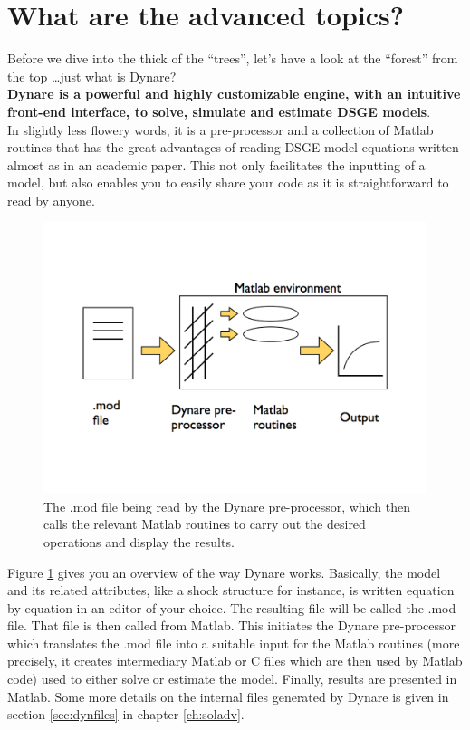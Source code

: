 \documentclass[cn,10pt,math=newtx,citestyle=gb7714-2015,bibstyle=gb7714-2015]{elegantbook}
\begin{document}
	
	\section{What are the advanced topics?}
	Before we dive into the thick of the ``trees'', let's have a look at the ``forest'' from the top \ldots just what is Dynare? \\
	
	\textbf{Dynare is a powerful and highly customizable engine, with an intuitive front-end interface, to solve, simulate and estimate DSGE models}. \\
	
	In slightly less flowery words, it is a pre-processor and a collection of Matlab routines that has the great advantages of reading DSGE model equations written almost as in an academic paper. This not only facilitates the inputting of a model, but also enables you to easily share your code as it is straightforward to read by anyone.\\
	\begin{figure} \label{fig:dyn}
		\begin{center}
			\includegraphics[width=1.0\textwidth]{P_DynareStruct2}
		\end{center}
		\caption[Dynare, a bird's eyeview]{The .mod file being read by the Dynare pre-processor, which then calls the relevant Matlab routines to carry out the desired operations and display the results.}
	\end{figure}
	
	Figure \ref{fig:dyn} gives you an overview of the way Dynare works. Basically, the model and its related attributes, like a shock structure for instance, is written equation by equation in an editor of your choice. The resulting file will be called the .mod file. That file is then called from Matlab. This initiates the Dynare pre-processor which translates the .mod file into a suitable input for the Matlab routines (more precisely, it creates intermediary Matlab or C files which are then used by Matlab code) used to either solve or estimate the model. Finally, results are presented in Matlab. Some more details on the internal files generated by Dynare is given in section \ref{sec:dynfiles} in chapter \ref{ch:soladv}. \\
	
\end{document}
